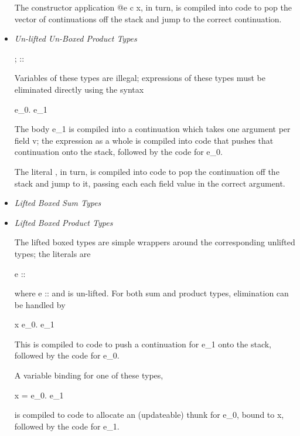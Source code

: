 \documentclass{article}
\newcommand\defn[1]{\emph{#1}}
\newcommand\for{\hskwd{for}}
\newcommand\crkwd[1]{\hskwd{"#1}}
\newcommand\crgroup[1]{\left\langle#1\right\rangle}
\newcommand\uconstr{\crkwd{uconstr}}
\newcommand\cruprod{\crkwd{u\Pi}}
\newcommand\lift[1]{\left\lfloor#1\right\rfloor}
\begin{document}
\begin{itemize}
        The constructor application \<\uconstr \tau @e c x\>, in turn,
        is compiled into code to pop the vector of continuations off the stack and
        jump to the correct continuation.

    \item \defn{Un-lifted Un-Boxed Product Types}

        \begin{haskell} \cruprod\crgroup{ ; } :: \cruprod\crgroup{  } \end{haskell}

        Variables of these types are illegal;
        expressions of these types must be eliminated directly using the syntax
        \begin{haskell} \for \cruprod\crgroup{  } \propto e_0. e_1 \end{haskell}
        The body \<e_1\> is compiled into a continuation which takes one argument per field \<v\>;
        the expression as a whole is compiled into code that pushes that continuation onto the stack,
        followed by the code for \<e_0\>.

        The literal \<\cruprod\crgroup{  }\>, in turn,
        is compiled into code to pop the continuation off the stack and jump to it,
        passing each each field value in the correct argument.

    \item \defn{Lifted Boxed Sum Types}
    \item \defn{Lifted Boxed Product Types}

        The lifted boxed types are simple wrappers around the corresponding unlifted types;
        the literals are
        \begin{haskell} \lift{e} :: \lift{\tau} \end{haskell}
        where \<e :: \tau\> and \<\tau\> is un-lifted.
        For both sum and product types, elimination can be handled by
        \begin{haskell} \for \lift{x} \propto e_0. e_1 \end{haskell}
        This is compiled to code to push a continuation for \<e_1\> onto the stack,
        followed by the code for \<e_0\>.

        A variable binding for one of these types,
        \begin{haskell} \for x = e_0. e_1 \end{haskell}
        is compiled to code to allocate an (updateable) thunk for \<e_0\>, bound to \<x\>,
        followed by the code for \<e_1\>.


\end{itemize}
\end{document}
